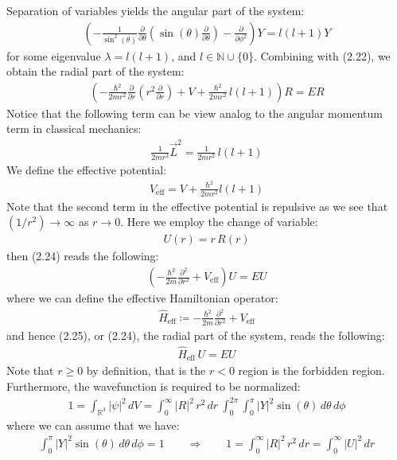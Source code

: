 \documentclass[11pt]{book}
\theoremstyle{break}
\theoremstyle{break}
\newcommand{\R}{\mathbb{R}}
\newcommand{\N}{\mathbb{N}}
\newcommand{\pd}{\partial}
\begin{document}
Separation of variables yields the angular part of the system:
\begin{align}
\left( - \frac{1}{\sin^2(\theta)} \frac{\pd}{\pd \theta}\left( \sin(\theta) \frac{\pd}{\pd \theta}\right) - \frac{\pd}{\pd \phi^2}\right)Y = l(l+1) Y
\end{align}
for some eigenvalue $\lambda = l(l+1)$, and $l \in \N \cup \{0\}$. Combining with (2.22), we obtain the radial part of the system:
\begin{align}
\left( - \frac{\hbar^2}{2mr^2} \frac{\pd}{\pd r}\left( r^2 \frac{\pd}{\pd r}\right) +V + \frac{\hbar^2}{2mr^2}\,l(l+1) \right) R = ER
\end{align}
Notice that the following term can be view analog to the angular momentum term in classical mechanics:
\begin{align*}
\frac{1}{2mr^2}\vec{L}^2 = \frac{1}{2mr^2}\, l(l+1)
\end{align*}
We define the effective potential:
\begin{align*}
V_{\text{eff}} = V+ \frac{\hbar^2}{2mr^2} l(l+1)
\end{align*}
Note that the second term in the effective potential is repulsive as we see that $(1/r^2) \to \infty$ as $r\to 0$. Here we employ the change of variable:
\begin{align*}
U(r) = r\, R(r)
\end{align*}
then (2.24) reads the following:
\begin{align}
\left( - \frac{\hbar^2}{2m}\frac{\pd^2}{\pd r^2} + V_{\text{eff}}\right) U = EU
\end{align}
where we can define the effective Hamiltonian operator:
\begin{align*}
\hat{H}_{\text{eff}} \coloneqq  - \frac{\hbar^2}{2m}\frac{\pd^2}{\pd r^2} + V_{\text{eff}}
\end{align*}
and hence (2.25), or (2.24), the radial part of the system, reads the following:
\begin{align*}
\hat{H}_{\text{eff}}\, U = EU
\end{align*}
Note that $r \geq 0$ by definition, that is the $r<0$ region is the forbidden region. \\

Furthermore, the wavefunction is required to be normalized:
\begin{align*}
1 = \int_{\R^3} |\psi|^2 \, dV = \int_0^\infty |R|^2\, r^2\, dr\ \int_{0}^{2\pi}\int_0^{\pi} |Y|^2 \sin(\theta)\, d\theta \, d\phi
\end{align*}
where we can assume that we have:
\begin{align*}
\int_0^{\pi} |Y|^2 \sin(\theta)\, d\theta \, d\phi = 1 \qquad \Rightarrow \qquad  1 =\int_0^\infty |R|^2\, r^2\, dr  = \int_{0}^\infty |U|^2 \, dr
\end{align*}
\end{document}
